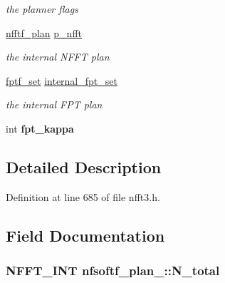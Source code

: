 \begin{DoxyCompactItemize}
\begin{DoxyCompactList}\small\item\em the planner flags \end{DoxyCompactList}\item 
\hypertarget{structnfsoftf__plan___a1be8436a257f63ab4c27441bf714671d}{\hyperlink{structnfftf__plan}{nfftf\-\_\-plan} \hyperlink{structnfsoftf__plan___a1be8436a257f63ab4c27441bf714671d}{p\-\_\-nfft}}\label{structnfsoftf__plan___a1be8436a257f63ab4c27441bf714671d}

\begin{DoxyCompactList}\small\item\em the internal N\-F\-F\-T plan \end{DoxyCompactList}\item 
\hypertarget{structnfsoftf__plan___a686809f1397b113322b77ef50c8c0ef7}{\hyperlink{nfft3_8h_a74cbbcba4b36c9272b3e1b309f574308}{fptf\-\_\-set} \hyperlink{structnfsoftf__plan___a686809f1397b113322b77ef50c8c0ef7}{internal\-\_\-fpt\-\_\-set}}\label{structnfsoftf__plan___a686809f1397b113322b77ef50c8c0ef7}

\begin{DoxyCompactList}\small\item\em the internal F\-P\-T plan \end{DoxyCompactList}\item 
\hypertarget{structnfsoftf__plan___a8c90aea24c280766f06ec042e21d9bb9}{int {\bfseries fpt\-\_\-kappa}}\label{structnfsoftf__plan___a8c90aea24c280766f06ec042e21d9bb9}

\end{DoxyCompactItemize}


\subsection{Detailed Description}


Definition at line 685 of file nfft3.\-h.



\subsection{Field Documentation}
\hypertarget{structnfsoftf__plan___a1355e6064c2a0dd4357ed856dd0074a6}{
\subsubsection[{N\-\_\-total}]{\setlength{\rightskip}{0pt plus 5cm}N\-F\-F\-T\-\_\-\-I\-N\-T nfsoftf\-\_\-plan\-\_\-\-::\-N\-\_\-total}}\label{structnfsoftf__plan___a1355e6064c2a0dd4357ed856dd0074a6}


